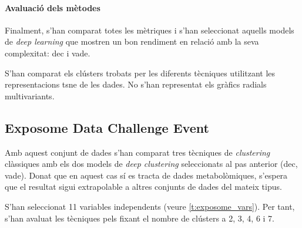 \documentclass[CAT,BIB]{TFUOC}%
\begin{document}
            \paragraph{Avaluació dels mètodes}
                Finalment,
                s'han comparat totes les mètriques
                i s'han seleccionat aquells models de \textit{deep learning}
                que mostren un bon rendiment en relació amb la seva complexitat:
                \gls{dec} i \gls{vade}.

                S'han comparat els clústers trobats per les diferents tècniques
                utilitzant les representacions \gls{tsne} de les dades.
                No s'han representat els gràfics radials multivariants.


        \subsection{Exposome Data Challenge Event}
        \label{s:exposome}

            Amb aquest conjunt de dades s'han comparat
            tres tècniques de \textit{clustering} clàssiques
            amb els dos models de \textit{deep clustering}
            seleccionats al pas anterior
            (\gls{dec}, \gls{vade}).
            Donat que en aquest cas sí es tracta de dades metabolòmiques,
            s'espera que el resultat sigui extrapolable
            a altres conjunts de dades del mateix tipus.

            S'han seleccionat 11 variables independents
            (veure \cref{t:exposome_vars}).
            Per tant, s'han avaluat les tècniques
            pels fixant el nombre de clústers a 2, 3, 4, 6 i 7.
\end{document}

